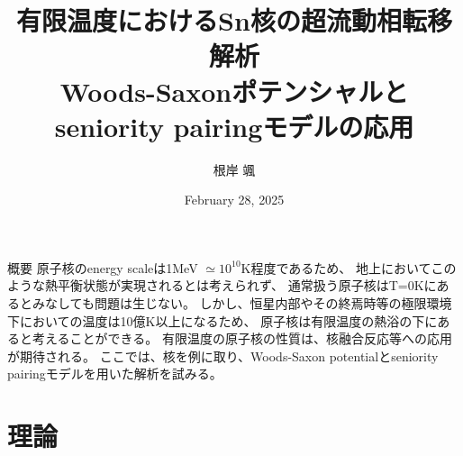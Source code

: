 \documentclass[aspectratio=169, 12pt, dvipdfmx]{beamer}
\title{有限温度におけるSn核の超流動相転移解析\\Woods-Saxonポテンシャルと\\seniority pairingモデルの応用}
\author{根岸 颯}
\date{February 28, 2025} %
\begin{document}
\begin{frame}
  \titlepage
\end{frame}

\begin{frame}
  
\end{frame}


\begin{frame}{概要}
  原子核のenergy scaleは1MeV $\simeq 10^{10}$K程度であるため、
  地上においてこのような熱平衡状態が実現されるとは考えられず、
  通常扱う原子核はT=0Kにあるとみなしても問題は生じない。
  しかし、恒星内部やその終焉時等の極限環境下においての温度は10億K以上になるため、
  原子核は有限温度の熱浴の下にあると考えることができる。
  有限温度の原子核の性質は、核融合反応等への応用が期待される。
  ここでは、核を例に取り、Woods-Saxon potentialとseniority pairingモデルを用いた解析を試みる。
\end{frame}

\section{理論}

\end{document}

